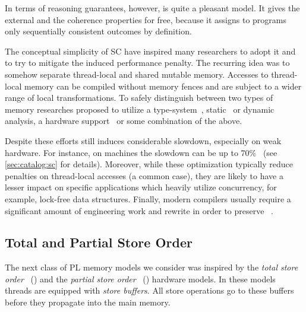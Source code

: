 In terms of reasoning guarantees, however, \SC is quite a pleasant model. 
It gives the external \DRF and the coherence properties for free, 
because it assigns to programs only sequentially consistent
outcomes by definition.

The conceptual simplicity of SC have inspired many researchers 
to adopt it and to try to mitigate the induced performance penalty.
The recurring idea was to somehow separate 
thread-local and shared mutable memory.
Accesses to thread-local memory can be compiled 
without memory fences and are subject to a wider range 
of local transformations.
To safely distinguish between two types of memory
researches proposed to utilize a type-system~\cite{Vollmer-al:PPoPP17},
static~\cite{Singh-al:ISCA12} or dynamic~\cite{Liu-al:PLDI19} analysis,
a hardware support~\cite{Singh-al:ISCA12, Marino-al:PLDI10}
or some combination of the above. 

Despite these efforts \SC still induces considerable slowdown,
especially on weak hardware.
For instance, on  machines 
the slowdown can be up to 70\%~\cite{Liu-al:PLDI19} 
(see \cref{sec:catalog:sc} for details).
Moreover, while these optimization typically reduce 
penalties on thread-local accesses (a common case), 
they are likely to have a lesser impact on specific 
applications which heavily utilize concurrency,
for example, lock-free data structures.
Finally, modern compilers usually require 
a significant amount of engineering work and rewrite
in order to preserve \SC~\cite{Marino-al:PLDI11, Liu-al:PLDI19}.

\subsection{Total and Partial Store Order}
\label{sec:analysis:tso}

The next class of PL memory models we consider 
was inspired by the \emph{total store order}~\cite{Sewell-al:CACM10} (\TSO) 
and the \emph{partial store order}~\cite{Sparc:94} (\PSO) hardware models. 
In these models threads are equipped with \emph{store buffers}.
All store operations go to these buffers before they 
propagate into the main memory.

